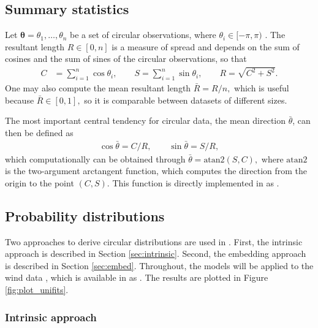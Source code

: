 \hypertarget{summary-statistics}{%
\subsection{Summary statistics}\label{summary-statistics}}

Let \(\boldsymbol{\theta}= \theta_1, \dots, \theta_n\) be a set of
circular observations, where \(\theta_i \in [-\pi, \pi)\) . The
resultant length \(R\in[0, n]\) is a measure of spread and depends on
the sum of cosines and the sum of sines of the circular observations, so
that \begin{align}
C &= \sum_{i=1}^n\cos \theta_i, \qquad
S = \sum_{i=1}^n\sin \theta_i, \qquad
R = \sqrt{C^2 + S^2}.
\end{align} One may also compute the mean resultant length
\(\bar{R} = R/n,\) which is useful because \(\bar{R} \in [0, 1],\) so it
is comparable between datasets of different sizes.

The most important central tendency for circular data, the mean
direction \(\bar\theta\), can then be defined as \begin{align}
\cos \bar \theta = C/R, \qquad
\sin \bar \theta = S/R,
\end{align} which computationally can be obtained through
\(\bar \theta = \text{atan2}(S, C),\) where \(\text{atan2}\) is the
two-argument arctangent function, which computes the direction from the
origin to the point \((C, S)\). This function is directly implemented in
 as .

\hypertarget{probability-distributions}{%
\subsection{Probability distributions}\label{probability-distributions}}

\label{sec:probdist} Two approaches to derive circular distributions are
used in . First, the intrinsic approach is described in
Section \ref{sec:intrinsic}. Second, the embedding approach is described
in Section \ref{sec:embed}. Throughout, the models will be applied to
the wind data \citep{agostinelli2007robust, fisher1995statistical},
which is available in  as . The
results are plotted in Figure \ref{fig:plot_unifits}.

\hypertarget{intrinsic-approach}{%
\subsubsection{Intrinsic approach}\label{intrinsic-approach}}

